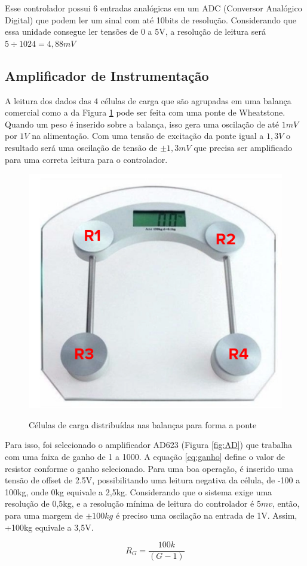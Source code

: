 \documentclass[a4paper, 12pt]{article}
\begin{document}
Esse controlador possui 6 entradas analógicas em um ADC (Conversor Analógico Digital) que podem ler um sinal com até 10bits de resolução. Considerando que essa unidade consegue ler tensões de 0 a 5V, a resolução de leitura será $ 5\div 1024 = 4,88mV  $

\subsection{Amplificador de Instrumentação}
A leitura dos dados das 4 células de carga que são agrupadas em uma balança comercial como a da Figura \ref{fig:balanca} pode ser feita com uma ponte de Wheatstone. Quando um peso é inserido sobre a balança, isso gera uma oscilação de até $ 1mV $ por $ 1V $ na alimentação. Com uma tensão de excitação da ponte igual a $ 1,3V $ o resultado será uma oscilação de tensão de $ \pm 1,3mV $ que precisa ser amplificado para uma correta leitura para o controlador. 

\begin{figure}[!htb]
	\centering
	\caption{Células de carga distribuídas nas balanças para forma a ponte}
	\includegraphics[width=.5\linewidth]{balanca}
	\label{fig:balanca}
\end{figure}

Para isso, foi selecionado o amplificador AD623 (Figura \ref{fig:AD}) que trabalha com uma faixa de ganho de 1 a 1000. A equação \ref{eq:ganho} define o valor de resistor conforme o ganho selecionado. Para uma boa operação, é inserido uma tensão de offset de 2.5V, possibilitando uma leitura negativa da célula, de -100 a 100kg, onde 0kg equivale a 2,5kg. Considerando que o sistema exige uma resolução de 0,5kg, e a resolução mínima de leitura do controlador é $ 5mv $, então, para uma margem de $ \pm100kg $ é preciso uma oscilação na entrada de 1V. Assim, +100kg equivale a 3,5V.

\begin{equation}
	R_G = \dfrac{100k}{(G-1)}
	\label{eq:ganho}
\end{equation}	
\end{document}
